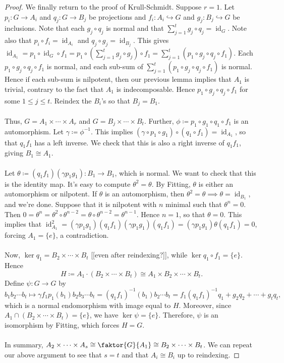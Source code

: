 \documentclass[10pt,letterpaper,cm]{nupset}
\theoremstyle{definition}
\theoremstyle{theorem}
\theoremstyle{remark}
\newcommand{\1}{\mathbf{1}}
\newcommand{\0}{\vec 0}
\DeclareMathOperator{\id}{id}
\begin{document}
\begin{proof}
We finally return to the proof of Krull-Schmidt. Suppose $r=1$. Let $p_i : G \to A_i$ and $q_j : G \to B_j$ be projections and $f_i : A_i \hookrightarrow G$ and $g_j : B_j \hookrightarrow G$ be inclusions. Note that each $g_j \circ q_j$ is normal and that $\sum_{j=1}^t g_j \circ q_j = \id_G$. Note also that $p_i \circ f_i = \id_{A_i}$ and $q_j \circ g_j = \id_{B_j}$. This gives $\id_{A_1} = p_1 \circ \id_G \circ f_1 = p_1 \circ (\sum_{j=1}^t g_j \circ g_j) \circ f_1 = \sum_{j=1}^t (p_1 \circ g_j \circ q_j \circ f_1)$. Each $p_1 \circ g_j \circ q_j \circ f_1$ is normal, and each sub-sum of $\sum_{j=1}^t (p_1 \circ g_j \circ q_j \circ f_1)$ is normal. Hence if each sub-sum is nilpotent, then our previous lemma implies that $A_1$ is trivial, contrary to the fact that $A_1$ is indecomposable. Hence $ p_1 \circ g_j \circ q_j \circ f_1$ for some $1\leq j \leq t$. Reindex the $B_i$'s so that $B_j = B_1$. 
\\ \\ Thus, $G= A_1 \times \cdots \times A_r$ and $G= B_j \times \cdots \times B_t$. Further, $\phi\coloneqq p_1\circ g_1\circ q_1\circ f_1$ is an automorphism. Let $\gamma\coloneqq  \phi^{-1}$. This implies $(\gamma \circ p_1 \circ g_1)\circ (q_1\circ f_1)=\id_{A_1}$, so that $q_1f_1$ has a left inverse. We check that this is also a right inverse of $q_1f_1$, giving $B_1 \cong A_1$.
\\ \\ Let $\theta \coloneqq  (q_1f_1)(\gamma p_1g_1) : B_1 \to B_1$, which is normal. We want to check that this is the identity map. It's easy to compute $ \theta^2 =  \theta.$
By Fitting, $\theta$ is either an automorphism or nilpotent. If $\theta$ is an automorphism, then $\theta^2 = \theta \implies \theta = \id_{B_1}$, and we're done. Suppose that it is nilpotent with $n$ minimal such that $\theta^n =0$. Then $0 = \theta^n = \theta^2 \circ \theta^{n-2} = \theta \circ \theta^{n-2}= \theta^{n-1}$. Hence $n=1$, so that $\theta =0$. This implies that $\id_{A_1}^2 = (\gamma p_1 g_1)(q_1 f_1)(\gamma p_1 g_1)(q_1 f_1) = (\gamma p_1 g_1)\theta(q_1 f_1) = 0$, forcing $A_1= \{e\}$, a contradiction.
\\ \\
Now, $\ker q_1 = B_2 \times \cdots \times B_t$ {[[even after reindexing?]]}, while $\ker q_1 \circ f_1 = \{e\}$. Hence $$H\coloneqq  A_1 \cdot (B_2 \times \cdots \times B_t) \cong A_1 \times B_2 \times \cdots \times B_t.$$ Define $\psi : G\to G$ by $$b_1b_2\cdots b_t \mapsto \gamma f_1p_1(b_1)b_2b_3\cdots b_t = (q_1f_1)^{-1}(b_1)b_2\cdots b_t= f_1(q_1f_1)^{-1}q_1 + g_2q_2+\cdots + g_tq_t ,$$ which is a normal endomorphism with image equal to $H$. Moreover, since $A_1\cap (B_2 \times \cdots \times B_t) =\{e\}$, we have $\ker \psi =\{e\}$. Therefore, $\psi$ is an isomorphism by Fitting, which forces $H=G$.
\\ \\ In summary, $A_2 \times \cdots \times A_s \cong \faktor{G}{A_1} \cong B_2\times \cdots \times B_t$. We can repeat our above argument to see that $s=t$ and that $A_i \cong B_i$ up to reindexing.
\end{proof}
\end{document}
